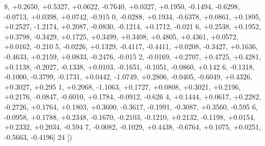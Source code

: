 \begin{DoxyCode}
      8, +0.2650, +0.5327, +0.0622, -0.7640, +0.0327, +0.1950, -0.1494, -0.6298, -0.0713, +0.0398, +0.0742, -0.915
      0, -0.0288, +0.1934, -0.6378, +0.0861, +0.1895, +0.2527, -1.2174, +0.2087, -0.0830, -0.1214, +0.1712, -0.021
      6, +0.2538, +0.1952, +0.3798, -0.3429, +0.1725, +0.3499, +0.3408, +0.4805, +0.4361, +0.0572, +0.0162, -0.210
      5, -0.0226, +0.1329, -0.4117, -0.4411, +0.0208, -0.3427, +0.1636, -0.4633, +0.2159, +0.0833, -0.2476, -0.015
      2, -0.0169, +0.2707, +0.4725, +0.4281, +0.1138, -0.2027, -0.1338, +0.0103, -0.1651, -0.1051, -0.0860, +0.142
      6, -0.1318, -0.1000, -0.3799, -0.1731, +0.0442, -1.0749, +0.2806, -0.0405, -0.6049, +0.4326, +0.3027, +0.295
      1, +0.2068, -1.1063, +0.1727, +0.0808, +0.3021, +0.2196, +0.2176, -0.0847, -0.6010, +0.1784, -0.0912, -0.626
      4, +0.1444, +0.0617, +0.2282, -0.2726, +0.1764, +0.1803, +0.3600, -0.3617, -0.1991, -0.3087, +0.3560, -0.595
      6, -0.0958, +0.1788, +0.2348, -0.1670, -0.2103, -0.1210, +0.2132, -0.1198, +0.0154, +0.2332, +0.2034, -0.594
      7, -0.0082, -0.1029, +0.4438, -0.6764, +0.1075, +0.0251, -0.5663, -0.4196]
24 ])
\end{DoxyCode}
